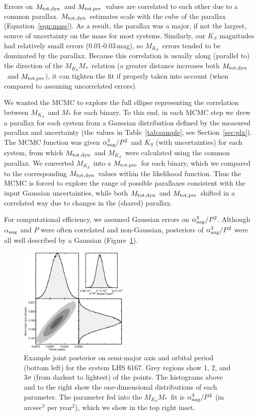\documentclass[twocolumn]{aastex62}
\newcommand{\mks}{$M_{K_S}$}
\newcommand{\mmk}{$M_{K_S}$\textendash$M_*$}
\newcommand{\mpred}{$M_{\rm{tot,pre}}$}
\newcommand{\mdyn}{$M_{\rm{tot,dyn}}$}
\begin{document}
Errors on \mdyn\ and \mpred\ values are correlated to each other due to a common parallax. \mdyn\ estimates scale with the cube of the parallax (Equation~\ref{eqn:mass}). As a result, the parallax was a major, if not the largest, source of uncertainty on the mass for most systems. Similarly, our $K_S$ magnitudes had relatively small errors (0.01-0.03\,mag), so \mks\ errors tended to be dominated by the parallax. Because this correlation is usually along (parallel to) the direction of the \mmk\ relation (a greater distance increases both \mdyn\ and \mpred), it can tighten the fit if properly taken into account (when compared to assuming uncorrelated errors). 

We wanted the MCMC to explore the full ellipse representing the correlation between \mks\ and $M_*$ for each binary. To this end, in each MCMC step we drew a parallax for each system from a Gaussian distribution defined by the measured parallax and uncertainty (the values in Table~\ref{tab:sample}, see Section~\ref{sec:plx}). The MCMC function was given $\alpha_{\rm{ang}}^3/P^2$ and $K_S$ (with uncertainties) for each system, from which \mdyn\ and \mks\ were calculated using the common parallax. We converted \mks\ into a \mpred\ for each binary, which we compared to the corresponding \mdyn\ values within the likelihood function. Thus the MCMC is forced to explore the range of possible parallaxes consistent with the input Gaussian uncertainties, while both \mdyn\ and \mpred\ shifted in a correlated way due to changes in the (shared) parallax. 

For computational efficiency, we assumed Gaussian errors on $\alpha_{\rm{ang}}^3/P^2$. Although $\alpha_{\rm{ang}}$ and $P$ were often correlated and non-Gaussian, posteriors of $\alpha_{\rm{ang}}^3/P^2$ were all well described by a Gaussian (Figure~\ref{fig:correlated}). 

\begin{figure}[htb]
\begin{center}
\includegraphics[width=0.47\textwidth]{LHS6167_corner.eps}
\caption{Example joint posterior on semi-major axis and orbital period (bottom left) for the system LHS 6167. Grey regions show 1, 2, and 3$\sigma$ (from darkest to lightest) of the points. The histograms above and to the right show the one-dimensional distributions of each parameter. The parameter fed into the \mmk\ fit is $\alpha_{\rm{ang}}^3/P^2$ (in arcsec$^3$ per year$^2$), which we show in the top right inset. }
\label{fig:correlated}
\end{center}
\end{figure}
\end{document}
